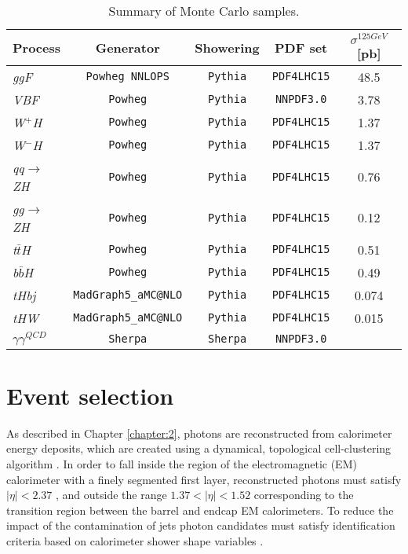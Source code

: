\documentclass[a4paper, oneside, 11pt, openright]{book}
\begin{document}
			\begin{table}[tbp]
				\centering
				\begin{tabular}{lcccc}
					\toprule[1.5pt]
					Process					& Generator						& Showering			& PDF set				& $\sigma^{125 GeV}$ [pb]		\\
					\midrule
					\textit{ggF}			& \texttt{Powheg NNLOPS}		& \texttt{Pythia}	& \texttt{PDF4LHC15}	& 48.5				\\
					\textit{VBF}			& \texttt{Powheg}				& \texttt{Pythia}	& \texttt{NNPDF3.0}		& 3.78				\\
					\textit{W$^+$H}			& \texttt{Powheg}				& \texttt{Pythia}	& \texttt{PDF4LHC15}	& 1.37				\\
					\textit{W$^-$H}			& \texttt{Powheg}				& \texttt{Pythia}	& \texttt{PDF4LHC15}	& 1.37				\\
					\textit{qq$\to$ZH}		& \texttt{Powheg}				& \texttt{Pythia}	& \texttt{PDF4LHC15}	& 0.76				\\
					\textit{gg$\to$ZH}		& \texttt{Powheg}				& \texttt{Pythia}	& \texttt{PDF4LHC15}	& 0.12				\\
					\textit{t$\bar{t}$H}	& \texttt{Powheg}				& \texttt{Pythia}	& \texttt{PDF4LHC15}	& 0.51				\\
					\textit{b$\bar{b}$H}	& \texttt{Powheg}				& \texttt{Pythia}	& \texttt{PDF4LHC15}	& 0.49				\\
					\textit{tHbj}			& \texttt{MadGraph5\_aMC@NLO}	& \texttt{Pythia}	& \texttt{PDF4LHC15}	& 0.074				\\
					\textit{tHW}			& \texttt{MadGraph5\_aMC@NLO}	& \texttt{Pythia}	& \texttt{PDF4LHC15}	& 0.015				\\
					\midrule
					\textit{$\gamma\gamma^{QCD}$} &  \texttt{Sherpa}		& \texttt{Sherpa}	& \texttt{NNPDF3.0}		&					\\
					\bottomrule[1.5pt]	
				\end{tabular}
				\caption{Summary of Monte Carlo samples.}
				\label{tab:MC_samples}
			\end{table}	
 	
 		\section{Event selection}\label{section:selection}
 			As described in Chapter \ref{chapter:2}, photons are reconstructed from calorimeter energy deposits, which are created using a dynamical, topological cell-clustering algorithm \cite{topo_cluster}. In order to fall inside the region of the electromagnetic (EM) calorimeter with a finely segmented first layer, reconstructed photons must satisfy $|\eta| < 2.37$ , and outside the range $1.37 < |\eta| < 1.52$ corresponding to the transition region between the barrel and endcap EM calorimeters. To reduce the impact of the contamination of jets photon candidates must satisfy identification criteria based on calorimeter shower shape variables \cite{Aad_2019}.
 			
\end{document}
